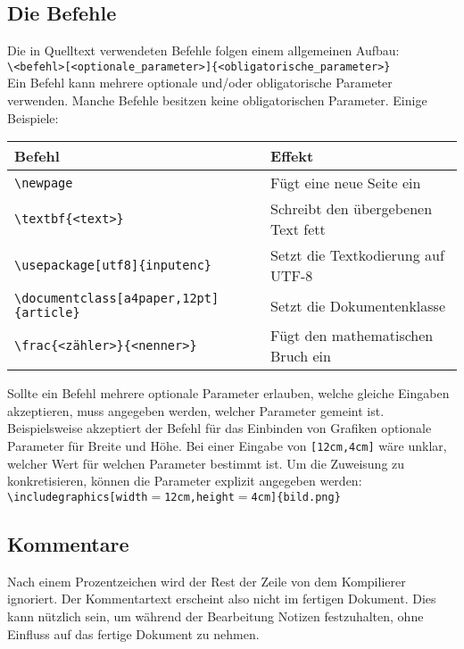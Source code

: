 \subsection{Die Befehle}
\label{sub:die_befehle}
Die in Quelltext verwendeten Befehle folgen einem allgemeinen Aufbau:\\
\texttt{\textbackslash <befehl>[<optionale\_parameter>]\{<obligatorische\_parameter>\}}\\
Ein Befehl kann mehrere optionale und/oder obligatorische Parameter verwenden. Manche Befehle besitzen keine obligatorischen Parameter. Einige Beispiele:\\
\begin{table}[h!]
	\begin{tabular}{ll}
		\toprule
		Befehl                                                                                     & Effekt                             \\
		\midrule
		\texttt{\textbackslash{}newpage}                                                                    & Fügt eine neue Seite ein           \\
		\texttt{\textbackslash{}textbf\{\textless{}text\textgreater{}\}}                                    & Schreibt den übergebenen Text fett \\
		\texttt{\textbackslash{}usepackage{[}utf8{]}\{inputenc\}}                                           & Setzt die Textkodierung auf UTF-8  \\
		\texttt{\textbackslash{}documentclass{[}a4paper,12pt{]}\{article\}}		                            & Setzt die Dokumentenklasse  \\
		\texttt{\textbackslash{}frac\{\textless{}zähler\textgreater{}\}\{\textless{}nenner\textgreater{}\}} & Fügt den mathematischen Bruch ein \\
		\bottomrule
	\end{tabular}
\end{table}
Sollte ein Befehl mehrere optionale Parameter erlauben, welche gleiche Eingaben akzeptieren, muss angegeben werden, welcher Parameter gemeint ist. Beispielsweise akzeptiert der Befehl für das Einbinden von Grafiken optionale Parameter für Breite und Höhe. Bei einer Eingabe von \texttt{\textellipsis{}[12cm,4cm]\textellipsis{}} wäre unklar, welcher Wert für welchen Parameter bestimmt ist. Um die Zuweisung zu konkretisieren, können die Parameter explizit angegeben werden:\\
\texttt{\textbackslash{}includegraphics{[}width$=$12cm,height$=$4cm{]}\{bild.png\}}

\subsection{Kommentare}
\label{sub:kommentare}
Nach einem Prozentzeichen wird der Rest der Zeile von dem Kompilierer ignoriert. Der Kommentartext erscheint also nicht im fertigen Dokument. Dies kann nützlich sein, um während der Bearbeitung Notizen festzuhalten, ohne Einfluss auf das fertige Dokument zu nehmen. 

